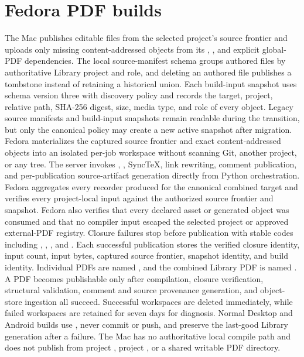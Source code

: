   {\section*{Fedora PDF builds}
The Mac publishes editable files from the selected project's source frontier and uploads only missing content-addressed objects from its , , and explicit global-PDF dependencies.
The local source-manifest schema groups authored files by authoritative Library project and role, and deleting an authored file publishes a tombstone instead of retaining a historical union.
Each build-input snapshot uses schema version three with discovery policy  and records the target, project, relative path, SHA-256 digest, size, media type, and role of every object.
Legacy source manifests and build-input snapshots remain readable during the transition, but only the canonical policy may create a new active snapshot after migration.
Fedora materializes the captured source frontier and exact content-addressed objects into an isolated per-job workspace without scanning Git, another project, or any  tree.
The server invokes , , SyncTeX, link rewriting, comment publication, and per-publication source-artifact generation directly from Python orchestration.
Fedora aggregates every recorder produced for the canonical combined target and verifies every project-local input against the authorized source frontier and snapshot.
Fedora also verifies that every declared asset or generated object was consumed and that no compiler input escaped the selected project or approved external-PDF registry.
Closure failures stop before publication with stable codes including , , , and .
Each successful publication stores the verified closure identity, input count, input bytes, captured source frontier, snapshot identity, and build identity.
Individual PDFs are named , and the combined Library PDF is named .
A PDF becomes publishable only after compilation, closure verification, structural validation, comment and source provenance generation, and object-store ingestion all succeed.
Successful workspaces are deleted immediately, while failed workspaces are retained for seven days for diagnosis.
Normal Desktop and Android builds use , never commit or push, and preserve the last-good Library generation after a failure.
The Mac has no authoritative local compile path and does not publish from project , project , or a shared writable PDF directory.}
